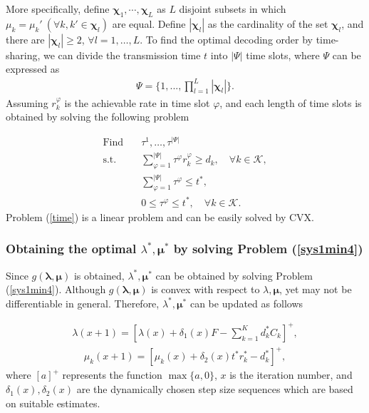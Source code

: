 \documentclass[journal]{IEEEtran}
\begin{document}
More specifically, define $\pmb {\chi}_1,\cdots,\pmb {\chi}_L $ as $L$ disjoint subsets in which $\mu_k=\mu_k'~(\forall k, k'\in \pmb\chi_l) $ are equal. Define $|\pmb \chi_l|$ as the cardinality of the set $\pmb \chi_l$, and there are $|\pmb \chi_l|\geq 2$, $\forall l=1,\dots, L$. To find the optimal decoding order by time-sharing, we can divide the transmission time $t$ into $|\Psi|$ time slots, where $\Psi$ can be expressed as
\begin{align}
\Psi=\{1,...,\prod \nolimits_{l=1}^L |\pmb \chi_l|\}.
\end{align}
Assuming $r_k^\varphi$ is the achievable rate in time slot $\varphi$, and each length of time slots is obtained by solving the following problem

\begin{subequations}\label{time}
	\begin{align}
	\text{Find}\quad
	&\tau^1,\dots,\tau^{|\Psi|}
	\\
	\textrm{s.t.}\quad
	& \sum_{\varphi=1}^{|\Psi|} \tau^\varphi r_k^\varphi\geq d_k, \quad \forall k\in\mathcal K,\\
	& \sum_{\varphi=1}^{|\Psi|} \tau^\varphi \leq t^*,\\
	&  0 \leq \tau^\varphi\leq t^*, \quad \forall k\in\mathcal K.
	\end{align}
\end{subequations}
Problem (\ref{time}) is a linear problem and can be easily solved by CVX.

\subsubsection{Obtaining the optimal $\lambda^*,\pmb\mu^*$ by solving Problem (\ref{sys1min4})}

Since $g(\pmb \lambda, \pmb \mu)$ is obtained, $\lambda^*,\pmb\mu^*$ can be obtained by solving Problem (\ref{sys1min4}). Although $g(\pmb \lambda, \pmb \mu)$ is convex with respect to $\lambda, \pmb \mu$, yet may not be differentiable in general. Therefore, $\lambda^*,\pmb\mu^*$ can be updated as follows

\begin{align}\label{lagrange1}
\lambda(x+1)=\left[\lambda(x)+\delta_1(x)F-\sum_{k=1}^K d^*_kC_k  \right]^+,
\end{align}
\begin{align}\label{lagrange2}
\mu_k(x+1)=\left[\mu_k(x)+\delta_2(x)t^*r^*_k- d^*_k  \right]^+,
\end{align}
where $[a]^+$ represents the function $\max\{a,0\}$, $x$ is the iteration number, and $\delta_1(x), \delta_2(x)$ are the dynamically chosen step size sequences which are based on suitable estimates.
\end{document}
